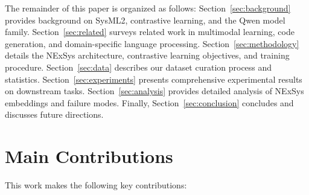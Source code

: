 \documentclass{article}
\begin{document}
The remainder of this paper is organized as follows: Section~\ref{sec:background} provides background on SysML2, contrastive learning, and the Qwen model family. Section~\ref{sec:related} surveys related work in multimodal learning, code generation, and domain-specific language processing. Section~\ref{sec:methodology} details the NExSys architecture, contrastive learning objectives, and training procedure. Section~\ref{sec:data} describes our dataset curation process and statistics. Section~\ref{sec:experiments} presents comprehensive experimental results on downstream tasks. Section~\ref{sec:analysis} provides detailed analysis of NExSys embeddings and failure modes. Finally, Section~\ref{sec:conclusion} concludes and discusses future directions.

\section{Main Contributions}
\label{sec:contributions}

This work makes the following key contributions:
\end{document}
